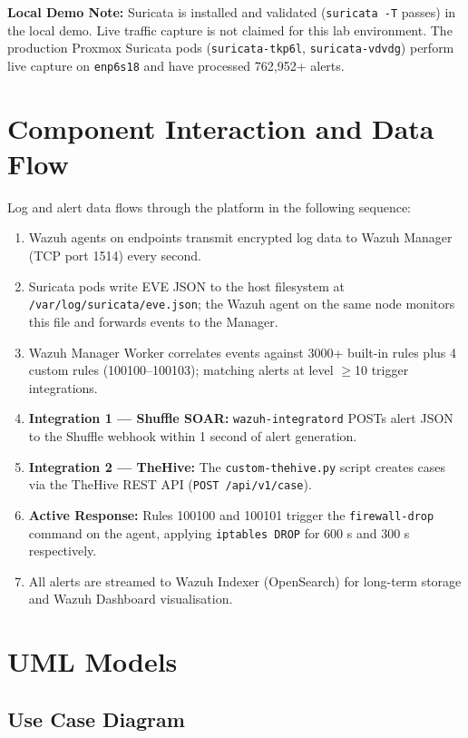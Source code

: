 \documentclass[12pt,a4paper]{report}
\begin{document}
\begin{infobox}
\textbf{Local Demo Note:} Suricata is installed and validated (\texttt{suricata -T} passes) in the local demo. Live traffic capture is not claimed for this lab environment. The production Proxmox Suricata pods (\texttt{suricata-tkp6l}, \texttt{suricata-vdvdg}) perform live capture on \texttt{enp6s18} and have processed 762,952+ alerts.
\end{infobox}

\section{Component Interaction and Data Flow}

Log and alert data flows through the platform in the following sequence:

\begin{enumerate}
  \item Wazuh agents on endpoints transmit encrypted log data to Wazuh Manager (TCP port 1514) every second.
  \item Suricata pods write EVE JSON to the host filesystem at \texttt{/var/log/suricata/eve.json}; the Wazuh agent on the same node monitors this file and forwards events to the Manager.
  \item Wazuh Manager Worker correlates events against 3000+ built-in rules plus 4 custom rules (100100--100103); matching alerts at level $\geq$10 trigger integrations.
  \item \textbf{Integration 1 --- Shuffle SOAR:} \texttt{wazuh-integratord} POSTs alert JSON to the Shuffle webhook within 1 second of alert generation.
  \item \textbf{Integration 2 --- TheHive:} The \texttt{custom-thehive.py} script creates cases via the TheHive REST API (\texttt{POST /api/v1/case}).
  \item \textbf{Active Response:} Rules 100100 and 100101 trigger the \texttt{firewall-drop} command on the agent, applying \texttt{iptables DROP} for 600 s and 300 s respectively.
  \item All alerts are streamed to Wazuh Indexer (OpenSearch) for long-term storage and Wazuh Dashboard visualisation.
\end{enumerate}

\section{UML Models}

\subsection{Use Case Diagram}
\end{document}
